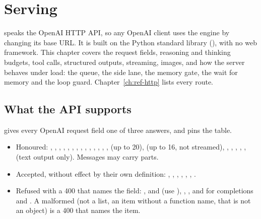 \chapter{Serving}\label{ch:serving}

 speaks the OpenAI HTTP API, so any OpenAI client uses the engine by changing its base URL. It is built on the Python standard library (), with no web framework. This chapter covers the request fields, reasoning and thinking budgets, tool calls, structured outputs, streaming, images, and how the server behaves under load: the queue, the side lane, the memory gate, the wait for memory and the loop guard. Chapter~\ref{ch:ref-http} lists every route.

\section{What the API supports}\label{sec:api-fields}

 gives every OpenAI request field one of three answers, and  pins the table.

\begin{itemize}
\item Honoured: , , , , , , , , , , , , , ,  (up to 20),  (up to 16, not streamed), , , , , ,  (text output only). Messages may carry  parts.
\item Accepted, without effect by their own definition: , , , , , , .
\item Refused with a 400 that names the field: ,  and  (use ), , , and for completions  and . A malformed  (not a list, an item without a function name,  that is not an object) is a 400 that names the item.
\end{itemize}

